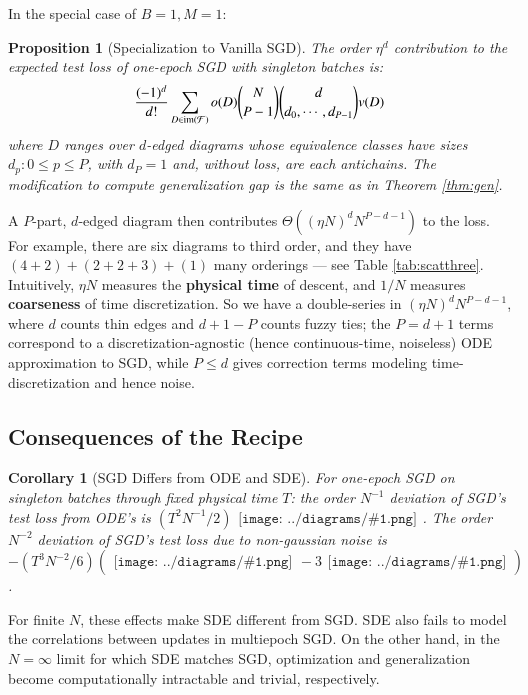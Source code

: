\documentclass{article}
\newtheorem{cor}{Corollary}
\newtheorem{prop}{Proposition}
\newcommand{\Free}{\mathcal{F}}
\newcommand{\image}{\text{\textnormal{im}}}
\newcommand{\sdia}[1]{\begin{gathered}\texttt{[image: ../diagrams/\#1.png]}\end{gathered}}
\begin{document}
        In the special case of $B=1, M=1$:
        \begin{prop}[Specialization to Vanilla SGD] \label{prop:vanilla}
            The order $\eta^d$ contribution to the expected test loss of one-epoch
            SGD with singleton batches is:
            \begin{equation}\label{eq:sgdbasiccoef}
                \frac{(-1)^d}{d!} \sum_{D\in \image(\Free)} 
                o(D) {N \choose P-1} {d \choose d_0,\cdots,d_{P-1}}
                v(D)
            \end{equation}
            where $D$ ranges over $d$-edged diagrams whose equivalence classes
            have sizes $d_p: 0\leq p\leq P$, with $d_P=1$
            and, without loss, are each antichains.  The modification to
            compute generalization gap is the same as in Theorem \ref{thm:gen}.
        \end{prop}
        A $P$-part, $d$-edged diagram then contributes $\Theta\left((\eta N)^d
        N^{P-d-1}\right)$ to the loss.  For example, there are six diagrams to
        third order, and they have $(4+2)+(2+2+3)+(1)$ many orderings --- see
        Table \ref{tab:scatthree}.  Intuitively, $\eta N$ measures the {\bf
        physical time} of descent, and $1/N$ measures {\bf coarseness} of time
        discretization.  So we have a double-series in $(\eta N)^d N^{P-d-1}$,
        where $d$ counts thin edges and $d+1-P$ counts fuzzy ties; the $P=d+1$
        terms correspond to a discretization-agnostic (hence continuous-time,
        noiseless) ODE approximation to SGD, while $P\leq d$ gives correction
        terms modeling time-discretization and hence noise.  


    \subsection{Consequences of the Recipe}

        \begin{cor}[SGD Differs from ODE and SDE] \label{cor:vsode}
            For one-epoch SGD on singleton batches through fixed physical time
            $T$: the order $N^{-1}$ deviation of SGD's test loss from ODE's is
            $
                ({{T^2 N^{-1}}/{2}}) \sdia{c(01-2)(02-12)}
            $.
            The order $N^{-2}$ deviation of SGD's test loss due to non-gaussian
            noise is
            $
                -({{T^3 N^{-2}}/{6}}) (\sdia{c(012-3)(03-13-23)} - 3 \sdia{c(01-2-3)(03-13-23)})
            $.
        \end{cor}
        For finite $N$, these effects make SDE different from SGD.  SDE also
        fails to model the correlations between updates in multiepoch SGD.  On
        the other hand, in the $N=\infty$ limit for which SDE matches SGD,
        optimization and generalization become computationally intractable and
        trivial, respectively. 
    
\end{document}
